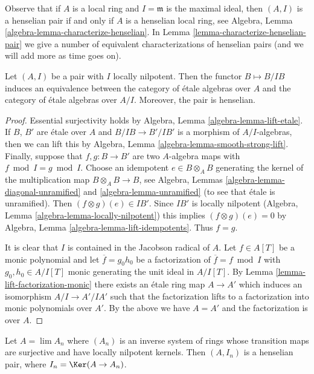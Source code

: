 \noindent
Observe that if $A$ is a local ring and $I = \mathfrak m$ is the maximal
ideal, then $(A, I)$ is a henselian pair if and only if $A$ is a henselian
local ring, see
Algebra, Lemma \ref{algebra-lemma-characterize-henselian}.
In Lemma \ref{lemma-characterize-henselian-pair} we give a number of
equivalent characterizations of
henselian pairs (and we will add more as time goes on).

\begin{lemma}
\label{lemma-locally-nilpotent-henselian}
Let $(A, I)$ be a pair with $I$ locally nilpotent. Then the functor
$B \mapsto B/IB$ induces an equivalence between the category of
\'etale algebras over $A$ and the category of \'etale algebras over $A/I$.
Moreover, the pair is henselian.
\end{lemma}

\begin{proof}
Essential surjectivity holds by Algebra, Lemma \ref{algebra-lemma-lift-etale}.
If $B$, $B'$ are \'etale over $A$ and $B/IB \to B'/IB'$ is a morphism
of $A/I$-algebras, then we can lift this by
Algebra, Lemma \ref{algebra-lemma-smooth-strong-lift}.
Finally, suppose that $f, g : B \to B'$ are two $A$-algebra
maps with $f \bmod I = g \bmod I$. Choose an idempotent $e \in B \otimes_A B$
generating the kernel of the multiplication map $B \otimes_A B \to B$,
see Algebra, Lemmas \ref{algebra-lemma-diagonal-unramified}
and \ref{algebra-lemma-unramified} (to see that \'etale is unramified).
Then $(f \otimes g)(e) \in IB'$. Since $IB'$ is locally nilpotent
(Algebra, Lemma \ref{algebra-lemma-locally-nilpotent}) this implies
$(f \otimes g)(e) = 0$ by Algebra, Lemma \ref{algebra-lemma-lift-idempotents}.
Thus $f = g$.

\medskip\noindent
It is clear that $I$ is contained in the Jacobson radical of $A$.
Let $f \in A[T]$ be a monic polynomial and let
$\overline{f} = g_0h_0$ be a factorization
of $\overline{f} = f \bmod I$ with $g_0, h_0 \in A/I[T]$ monic
generating the unit ideal in $A/I[T]$. By
Lemma \ref{lemma-lift-factorization-monic}
there exists an \'etale ring map $A \to A'$ which
induces an isomorphism $A/I \to A'/IA'$ such that
the factorization lifts to a factorization into monic polynomials
over $A'$. By the above we have $A = A'$ and the factorization
is over $A$.
\end{proof}

\begin{lemma}
\label{lemma-limit-henselian}
Let $A = \lim A_n$ where $(A_n)$ is an inverse system of rings
whose transition maps are surjective and have locally nilpotent kernels.
Then $(A, I_n)$ is a henselian pair, where $I_n = \Ker(A \to A_n)$.
\end{lemma}

